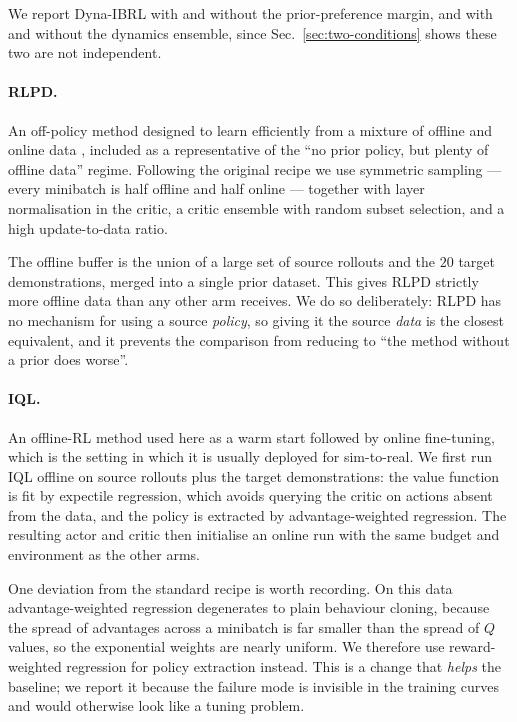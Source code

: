 We report Dyna-IBRL with and without the prior-preference margin, and with and
without the dynamics ensemble, since Sec.~\ref{sec:two-conditions} shows these
two are not independent.

\paragraph{RLPD.}
An off-policy method designed to learn efficiently from a mixture of offline and
online data \citep{ball2023rlpd}, included as a representative of the
``no prior policy, but plenty of offline data'' regime. Following the original
recipe we use symmetric sampling --- every minibatch is half offline and half
online --- together with layer normalisation in the critic, a critic ensemble
with random subset selection, and a high update-to-data ratio.

The offline buffer is the union of a large set of source rollouts and the $20$
target demonstrations, merged into a single prior dataset. This gives RLPD
strictly more offline data than any other arm receives. We do so deliberately:
RLPD has no mechanism for using a source \emph{policy}, so giving it the source
\emph{data} is the closest equivalent, and it prevents the comparison from
reducing to ``the method without a prior does worse''.

\paragraph{IQL.}
An offline-RL method \citep{kostrikov2022iql} used here as a warm start followed
by online fine-tuning, which is the setting in which it is usually deployed for
sim-to-real. We first run IQL offline on source rollouts plus the target
demonstrations: the value function is fit by expectile regression, which avoids
querying the critic on actions absent from the data, and the policy is extracted
by advantage-weighted regression. The resulting actor and critic then initialise
an online run with the same budget and environment as the other arms.

One deviation from the standard recipe is worth recording. On this data
advantage-weighted regression degenerates to plain behaviour cloning, because
the spread of advantages across a minibatch is far smaller than the spread of
$Q$ values, so the exponential weights are nearly uniform. We therefore use
reward-weighted regression for policy extraction instead. This is a change that
\emph{helps} the baseline; we report it because the failure mode is invisible in
the training curves and would otherwise look like a tuning problem.

